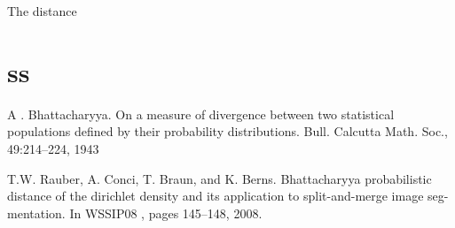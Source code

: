 \documentclass[11pt]{book}
\begin{document}
The distance

\section{ss}


A . Bhattacharyya.  On  a  measure  of  divergence  between two  statistical populations  defined  by  their  probability distributions.    Bull.  Calcutta Math.  Soc.,  49:214–224, 1943

T.W. Rauber, A. Conci, T. Braun, and K. Berns. Bhattacharyya probabilistic distance of the dirichlet density and its application to split-and-merge image seg- mentation. In WSSIP08 , pages 145–148, 2008. 
\end{document}
